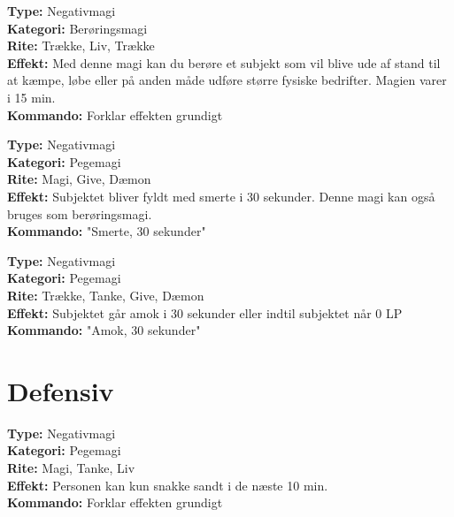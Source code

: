 \begin{offensiv*}[Svaghed]
\textbf{Type:} Negativmagi\\
\textbf{Kategori:} Berøringsmagi\\ 
\textbf{Rite:} Trække, Liv, Trække\\
\textbf{Effekt:} Med denne magi kan du berøre et subjekt som vil blive ude af stand til at kæmpe, løbe eller på anden måde udføre større fysiske bedrifter. Magien varer i 15 min.\\
\textbf{Kommando:} Forklar effekten grundigt
\end{offensiv*}

\begin{offensiv*}[Smerte]
\textbf{Type:} Negativmagi\\
\textbf{Kategori:} Pegemagi\\
\textbf{Rite:} Magi, Give, Dæmon\\
\textbf{Effekt:} Subjektet bliver fyldt med smerte i 30 sekunder. Denne magi kan også bruges som berøringsmagi.\\
\textbf{Kommando:} "Smerte, 30 sekunder"
\end{offensiv*}

\begin{offensiv*}[Amok]
\textbf{Type:} Negativmagi\\
\textbf{Kategori:} Pegemagi\\
\textbf{Rite:} Trække, Tanke, Give, Dæmon\\
\textbf{Effekt:} Subjektet går amok i 30 sekunder eller indtil subjektet når 0 LP\\
\textbf{Kommando:} "Amok, 30 sekunder"\\
\end{offensiv*}

\section{Defensiv}

\begin{defensiv*}[Sandhed]
\textbf{Type:} Negativmagi\\
\textbf{Kategori:} Pegemagi\\
\textbf{Rite:} Magi, Tanke, Liv\\
\textbf{Effekt:} Personen kan kun snakke sandt i de næste 10 min.\\
\textbf{Kommando:} Forklar effekten grundigt\\
\end{defensiv*}

